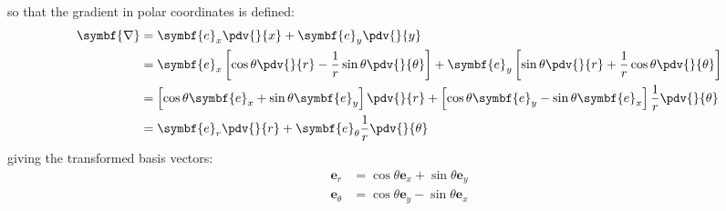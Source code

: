 \documentclass{article}
\begin{document}
so that the gradient in polar coordinates is defined:
\begin{align*}
    \symbf{\nabla} & = \symbf{e}_x \pdv{}{x} + \symbf{e}_y \pdv{}{y}                                                                                                                                             \\
                   & = \symbf{e}_x \left[ \cos{\theta} \pdv{}{r} - \frac{1}{r} \sin{\theta} \pdv{}{\theta} \right] + \symbf{e}_y \left[ \sin{\theta} \pdv{}{r} + \frac{1}{r} \cos{\theta} \pdv{}{\theta} \right] \\
                   & = \left[ \cos{\theta} \symbf{e}_x + \sin{\theta} \symbf{e}_y \right] \pdv{}{r} + \left[ \cos{\theta} \symbf{e}_y - \sin{\theta} \symbf{e}_x \right] \frac{1}{r} \pdv{}{\theta}              \\
                   & = \symbf{e}_r \pdv{}{r} + \symbf{e}_\theta \frac{1}{r} \pdv{}{\theta}
\end{align*}
giving the transformed basis vectors:
\begin{align*}
    \symbf{e}_r      & = \cos{\theta} \symbf{e}_x + \sin{\theta} \symbf{e}_y \\
    \symbf{e}_\theta & = \cos{\theta} \symbf{e}_y - \sin{\theta} \symbf{e}_x
\end{align*}
\end{document}
